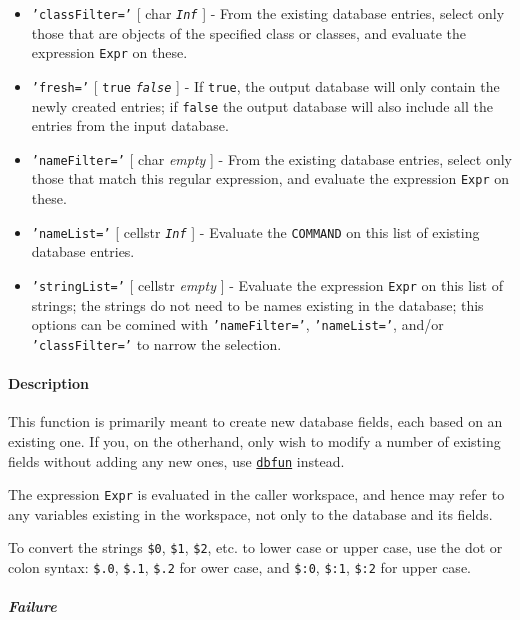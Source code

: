 \begin{itemize}
\item
  \texttt{'classFilter='} {[} char \textbar{} \emph{\texttt{Inf}} {]} -
  From the existing database entries, select only those that are objects
  of the specified class or classes, and evaluate the expression
  \texttt{Expr} on these.
\item
  \texttt{'fresh='} {[} \texttt{true} \textbar{} \emph{\texttt{false}}
  {]} - If \texttt{true}, the output database will only contain the
  newly created entries; if \texttt{false} the output database will also
  include all the entries from the input database.
\item
  \texttt{'nameFilter='} {[} char \textbar{} \emph{empty} {]} - From the
  existing database entries, select only those that match this regular
  expression, and evaluate the expression \texttt{Expr} on these.
\item
  \texttt{'nameList='} {[} cellstr \textbar{} \emph{\texttt{Inf}} {]} -
  Evaluate the \texttt{COMMAND} on this list of existing database
  entries.
\item
  \texttt{'stringList='} {[} cellstr \textbar{} \emph{empty} {]} -
  Evaluate the expression \texttt{Expr} on this list of strings; the
  strings do not need to be names existing in the database; this options
  can be comined with \texttt{'nameFilter='}, \texttt{'nameList='},
  and/or \texttt{'classFilter='} to narrow the selection.
\end{itemize}

\paragraph{Description}

This function is primarily meant to create new database fields, each
based on an existing one. If you, on the otherhand, only wish to modify
a number of existing fields without adding any new ones, use
\href{dbase/dbfun}{\texttt{dbfun}} instead.

The expression \texttt{Expr} is evaluated in the caller workspace, and
hence may refer to any variables existing in the workspace, not only to
the database and its fields.

To convert the strings \texttt{\$0}, \texttt{\$1}, \texttt{\$2}, etc. to
lower case or upper case, use the dot or colon syntax: \texttt{\$.0},
\texttt{\$.1}, \texttt{\$.2} for ower case, and \texttt{\$:0},
\texttt{\$:1}, \texttt{\$:2} for upper case.

\subparagraph{Failure}

